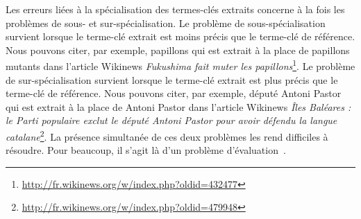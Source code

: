        Les erreurs liées à la spécialisation des termes-clés extraits concerne
        à la fois les problèmes de sous- et sur-spécialisation. Le problème de
        sous-spécialisation survient lorsque le terme-clé extrait est moins
        précis que le terme-clé de référence. Nous pouvons citer, par exemple,
        \og{}papillons\fg{} qui est extrait à la place de \og{}papillons
        mutants\fg{} dans l'article Wikinews \textit{Fukushima fait muter les
        papillons}\footnote{\url{http://fr.wikinews.org/w/index.php?oldid=432477}}.
        Le problème de sur-spécialisation survient lorsque le terme-clé extrait
        est plus précis que le terme-clé de référence. Nous pouvons citer, par
        exemple, \og{}député Antoni Pastor\fg{} qui est extrait à la place de
        \og{}Antoni Pastor\fg{} dans l'article Wikinews \textit{Îles Baléares :
        le Parti populaire exclut le député Antoni Pastor pour avoir défendu la
        langue
        catalane}\footnote{\url{http://fr.wikinews.org/w/index.php?oldid=479948}}.
        La présence simultanée de ces deux problèmes les rend difficiles à
        résoudre. Pour beaucoup, il s'agit là d'un problème
        d'évaluation~\cite{zesch2009rprecision}.
%
%
